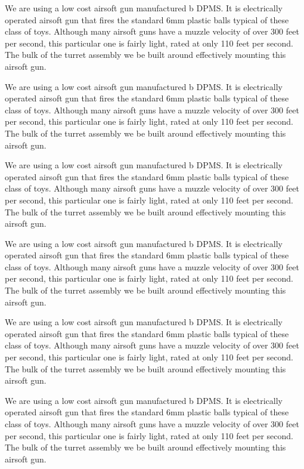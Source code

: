 \documentclass[10pt,twocolumn,letterpaper]{article}
\begin{document}
We are using a low cost airsoft gun manufactured b DPMS. It is electrically operated airsoft gun that fires the standard 6mm plastic balls typical of these class of toys. Although many airsoft guns have a muzzle velocity of over 300 feet per second, this particular one is fairly light, rated at only 110 feet per second. The bulk of the turret assembly we be built around effectively mounting this airsoft gun.

We are using a low cost airsoft gun manufactured b DPMS. It is electrically operated airsoft gun that fires the standard 6mm plastic balls typical of these class of toys. Although many airsoft guns have a muzzle velocity of over 300 feet per second, this particular one is fairly light, rated at only 110 feet per second. The bulk of the turret assembly we be built around effectively mounting this airsoft gun.

We are using a low cost airsoft gun manufactured b DPMS. It is electrically operated airsoft gun that fires the standard 6mm plastic balls typical of these class of toys. Although many airsoft guns have a muzzle velocity of over 300 feet per second, this particular one is fairly light, rated at only 110 feet per second. The bulk of the turret assembly we be built around effectively mounting this airsoft gun.

We are using a low cost airsoft gun manufactured b DPMS. It is electrically operated airsoft gun that fires the standard 6mm plastic balls typical of these class of toys. Although many airsoft guns have a muzzle velocity of over 300 feet per second, this particular one is fairly light, rated at only 110 feet per second. The bulk of the turret assembly we be built around effectively mounting this airsoft gun.

We are using a low cost airsoft gun manufactured b DPMS. It is electrically operated airsoft gun that fires the standard 6mm plastic balls typical of these class of toys. Although many airsoft guns have a muzzle velocity of over 300 feet per second, this particular one is fairly light, rated at only 110 feet per second. The bulk of the turret assembly we be built around effectively mounting this airsoft gun.

We are using a low cost airsoft gun manufactured b DPMS. It is electrically operated airsoft gun that fires the standard 6mm plastic balls typical of these class of toys. Although many airsoft guns have a muzzle velocity of over 300 feet per second, this particular one is fairly light, rated at only 110 feet per second. The bulk of the turret assembly we be built around effectively mounting this airsoft gun.
\end{document}
